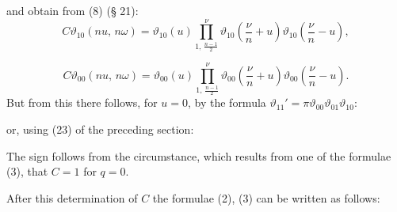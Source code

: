 and obtain from (8) (§ 21):
\[
C\vartheta_{10}(nu,\,n\omega) = \vartheta_{10}(u) \prod_{1,\,\frac{n-1}{2}}^{\nu} \vartheta_{10}\left(\frac{\nu}{n} + u\right)\vartheta_{10}\left(\frac{\nu}{n} - u\right),
\]


\[
C\vartheta_{00}(nu,\,n\omega) = \vartheta_{00}(u) \prod_{1,\,\frac{n-1}{2}}^{\nu} \vartheta_{00}\left(\frac{\nu}{n} + u\right)\vartheta_{00}\left(\frac{\nu}{n} - u\right).
\]
But from this there follows, for $u = 0$, by the formula $\vartheta_{11}' = \pi\vartheta_{00}\vartheta_{01}\vartheta_{10}$:


or, using (23) of the preceding section:


The sign follows from the circumstance, which results from one of the formulae (3), that $C = 1$ for $q = 0$.

After this determination of $C$ the formulae (2), (3) can be written as follows:



